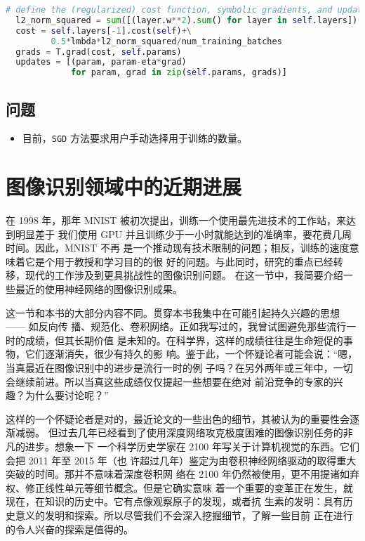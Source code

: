 \begin{lstlisting}[language=Python]
  # define the (regularized) cost function, symbolic gradients, and updates
  l2_norm_squared = sum([(layer.w**2).sum() for layer in self.layers])
  cost = self.layers[-1].cost(self)+\
         0.5*lmbda*l2_norm_squared/num_training_batches
  grads = T.grad(cost, self.params)
  updates = [(param, param-eta*grad) 
             for param, grad in zip(self.params, grads)]
\end{lstlisting}



\subsection*{问题}

\begin{itemize}
\item 目前，\lstinline!SGD! 方法要求用户手动选择用于训练\epochs{}的数量。
\end{itemize}

\section{图像识别领域中的近期进展}
\label{sec:recent_progress_in_image_recognition}

在 1998 年，那年 MNIST 被初次提出，训练一个使用最先进技术的工作站，来达到明显差于
我们使用 GPU 并且训练少于一小时就能达到的准确率，要花费几周时间。因此，MNIST 不再
是一个推动现有技术限制的问题；相反，训练的速度意味着它是个用于教授和学习目的的很
好的问题。与此同时，研究的重点已经转移，现代的工作涉及到更具挑战性的图像识别问题。
在这一节中，我简要介绍一些最近的使用神经网络的图像识别成果。

这一节和本书的大部分内容不同。贯穿本书我集中在可能引起持久兴趣的思想 —— 如反向传
播、规范化、卷积网络。正如我写过的，我曾试图避免那些流行一时的成绩，但其长期价值
是未知的。在科学界，这样的成绩往往是生命短促的事物，它们逐渐消失，很少有持久的影
响。鉴于此，一个怀疑论者可能会说：“嗯，当真最近在图像识别中的进步是流行一时的例
子吗？在另外两年或三年中，一切会继续前进。所以当真这些成绩仅仅提起一些想要在绝对
前沿竞争的专家的兴趣？为什么要讨论呢？”

这样的一个怀疑论者是对的，最近论文的一些出色的细节，其被认为的重要性会逐渐减弱。
但过去几年已经看到了使用深度网络攻克极度困难的图像识别任务的非凡的进步。想象一下
一个科学历史学家在 2100 年写关于计算机视觉的东西。它们会把 2011 年至 2015 年（也
许超过几年）鉴定为由卷积神经网络驱动的取得重大突破的时间。那并不意味着深度卷积网
络在 2100 年仍然被使用，更不用提诸如弃权、修正线性单元等细节概念。但是它确实意味
着一个重要的变革正在发生，就现在，在知识的历史中。它有点像观察原子的发现，或者抗
生素的发明：具有历史意义的发明和探索。所以尽管我们不会深入挖掘细节，了解一些目前
正在进行的令人兴奋的探索是值得的。\\

